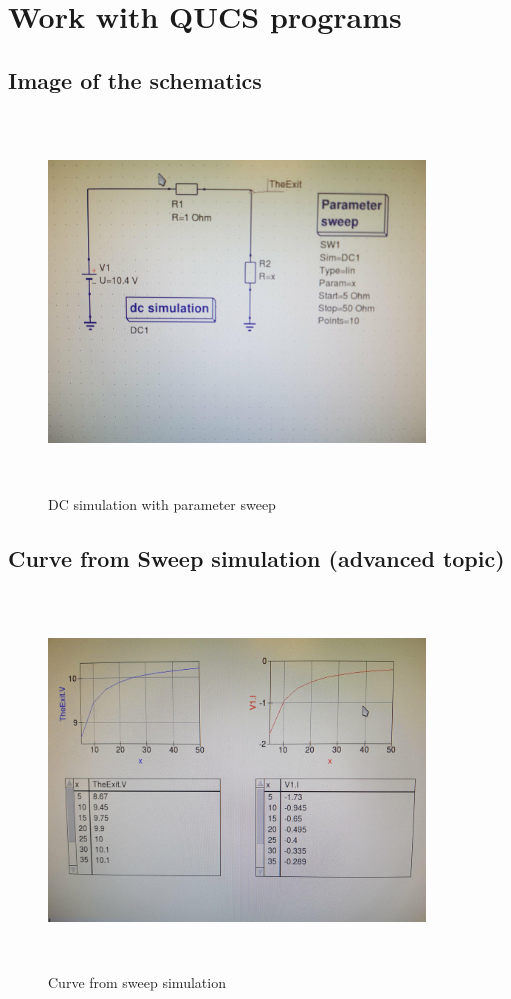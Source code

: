 \documentclass{report}
\begin{document}
\section{Work with QUCS programs}
  \subsection{Image of the schematics}
  \begin{figure}[!tb]
    \includegraphics[width=10cm,height=10cm,keepaspectratio]{dc-sim.jpg}
    \caption{DC simulation with parameter sweep}
\end{figure}

      
  \subsection{Curve from Sweep simulation (advanced topic)}
  \begin{figure}[!tb]
    \includegraphics[width=10cm,height=10cm,keepaspectratio]{result-graph.jpg}
    \caption{Curve from sweep simulation}
\end{figure}
\end{document}
